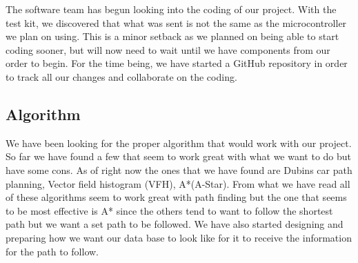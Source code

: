 The software team has begun looking into the coding of our project. With the test kit, we discovered that what was sent is not the same as the microcontroller we plan on using. This is a minor setback as we planned on being able to start coding sooner, but will now need to wait until we have components from our order to begin. For the time being, we have started a GitHub repository in order to track all our changes and collaborate on the coding. \par

\subsection{Algorithm}
We have been looking for the proper algorithm that would work with our project. So far we have found a few that seem to work great with what we want to do but have some cons. As of right now the ones that we have found are Dubins car path planning, Vector field histogram (VFH), A*(A-Star). From what we have read all of these algorithms seem to work great with path finding but the one that seems to be most effective is A* since the others tend to want to follow the shortest path but we want a set path to be followed. We have also started designing and preparing how we want our data base to look like for it to receive the information for the path to follow. \par
